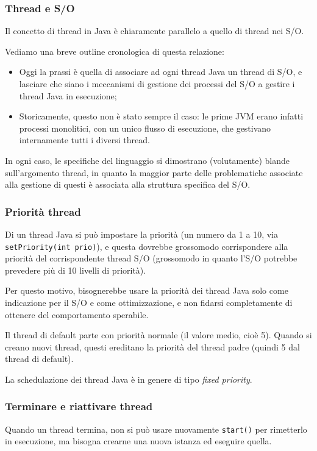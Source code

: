 \documentclass[a4paper,11pt]{article}
\begin{document}
\subsubsection{Thread e S/O}
Il concetto di thread in Java è chiaramente parallelo a quello di thread nei S/O.

Vediamo una breve outline cronologica di questa relazione: 
\begin{itemize}
	\item 
Oggi la prassi è quella di associare ad ogni thread Java un thread di S/O, e lasciare che siano i meccanismi di gestione dei processi del S/O a gestire i thread Java in esecuzione;

\item
Storicamente, questo non è stato sempre il caso: le prime JVM erano infatti processi monolitici, con un unico flusso di esecuzione, che gestivano internamente tutti i diversi thread.
\end{itemize}

In ogni caso, le specifiche del linguaggio si dimostrano (volutamente) blande sull'argomento thread, in quanto la maggior parte delle problematiche associate alla gestione di questi è associata alla struttura specifica del S/O.

\subsubsection{Priorità thread}
Di un thread Java si può impostare la priorità (un numero da 1 a 10, via \lstinline|setPriority(int prio)|), e questa dovrebbe grossomodo corrispondere alla priorità del corrispondente thread S/O (grossomodo in quanto l'S/O potrebbe prevedere più di 10 livelli di priorità).

Per questo motivo, bisognerebbe usare la priorità dei thread Java solo come indicazione per il S/O e come ottimizzazione, e non fidarsi completamente di ottenere del comportamento sperabile. 

Il thread di default parte con priorità normale (il valore medio, cioè 5).
Quando si creano nuovi thread, questi ereditano la priorità del thread padre (quindi 5 dal thread di default).

La schedulazione dei thread Java è in genere di tipo \textit{fixed priority}. 

\subsubsection{Terminare e riattivare thread}
Quando un thread termina, non si può usare nuovamente \lstinline|start()| per rimetterlo in esecuzione, ma bisogna crearne una nuova istanza ed eseguire quella.
\end{document}
